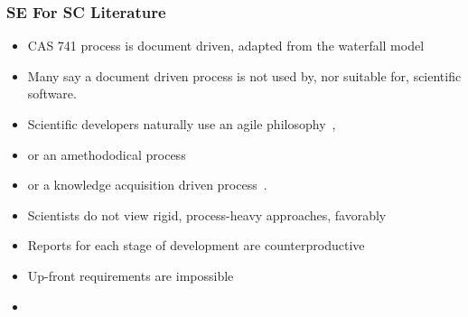 \documentclass[t,12pt,numbers,fleqn]{beamer}
\begin{document}

\begin{frame}
\frametitle{SE For SC Literature}

\begin {itemize}

\item CAS 741 process is document driven, adapted
from the waterfall model~\cite{GhezziEtAl2003, VanVliet2000}
\item Many say a document driven process is not used by, nor suitable for,
scientific software.
\bi
\item Scientific developers naturally use an agile
  philosophy~\cite{AckroydEtAl2008, CarverEtAl2007, EasterbrookAndJohns2009, Segal2005}, 
\item or an amethododical process~\cite{Kelly2013}
\item or a knowledge acquisition driven process~\cite{Kelly2015}.
\ei
\item Scientists do not view rigid, process-heavy approaches,
  favorably~\cite{CarverEtAl2007}
\item Reports for each stage of development are counterproductive~\cite[p.~373]{Roache1998}
\item Up-front requirements are
impossible~\cite{CarverEtAl2007, SegalAndMorris2008}
\item {}
\end{itemize}

\end{frame}

\end{document}
